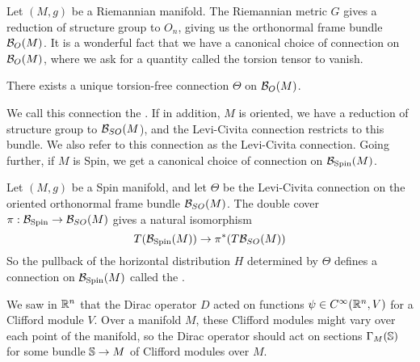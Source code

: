 Let $(M,g)$ be a Riemannian manifold. The Riemannian metric $G$ gives a
reduction of structure group to $O_n$, giving us the orthonormal frame bundle
$\B_O(M)$. It is a wonderful fact that we have a canonical choice of connection
on $\B_O(M)$, where we ask for a quantity called the torsion tensor to vanish.
%
\begin{thm}
 There exists a unique torsion-free connection $\Theta$ on $\B_O(M)$.
\end{thm}
We call this connection the . If in addition,
$M$ is oriented, we have a reduction of structure group to $\B_{SO}(M$), and
the Levi-Civita connection restricts to this bundle. We also refer to this
connection as the Levi-Civita connection. Going further, if $M$ is Spin,
we get a canonical choice of connection on $\B_{\Spin}(M)$.
%
\begin{defn}
 Let $(M,g)$ be a Spin manifold, and let $\Theta$ be the Levi-Civita connection
 on the oriented orthonormal frame bundle $\B_{SO}(M)$. The double cover
 $\pi : \B_{\Spin} \to \B_{SO}(M)$ gives a natural isomorphism
 \[
  T(\B_{\Spin}(M)) \to \pi^*(T\B_{SO}(M))
 \]
 So the pullback of the horizontal distribution $H$ determined by $\Theta$
 defines a connection on $\B_{\Spin}(M)$ called the .
\end{defn}
%
We saw in $\R^n$ that the Dirac operator $D$ acted on functions
$\psi \in C^\infty(\R^n, V)$ for a Clifford module $V$. Over a manifold $M$,
these Clifford modules might vary over each point of the manifold, so the
Dirac operator should act on sections $\Gamma_M(\S)$ for some bundle $\S \to M$
of Clifford modules over $M$. \\
%

